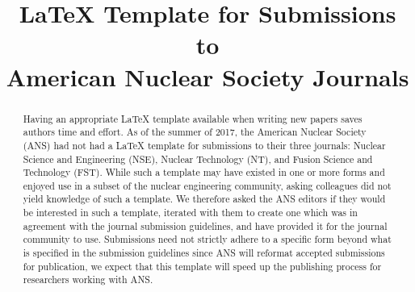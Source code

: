 \documentclass{nseJournal}
\begin{document}
\title{{\LaTeX} Template for Submissions to \\American Nuclear Society Journals} %

{}
{}

{}


\titlePage

\begin{abstract}
Having an appropriate {\LaTeX} template available when writing new papers saves authors time and effort.
As of the summer of 2017, the American Nuclear Society (ANS) had not had a {\LaTeX} template for submissions to their three journals: Nuclear Science and Engineering (NSE), Nuclear Technology (NT), and Fusion Science and Technology (FST).
While such a template may have existed in one or more forms and enjoyed use in a subset of the nuclear engineering community, asking colleagues did not yield knowledge of such a template.
We therefore asked the ANS editors if they would be interested in such a template, iterated with them to create one which was in agreement with the journal submission guidelines, and have provided it for the journal community to use.
Submissions need not strictly adhere to a specific form beyond what is specified in the submission guidelines since ANS will reformat accepted submissions for publication, we expect that this template will speed up the publishing process for researchers working with ANS.
\end{abstract}
\end{document}
